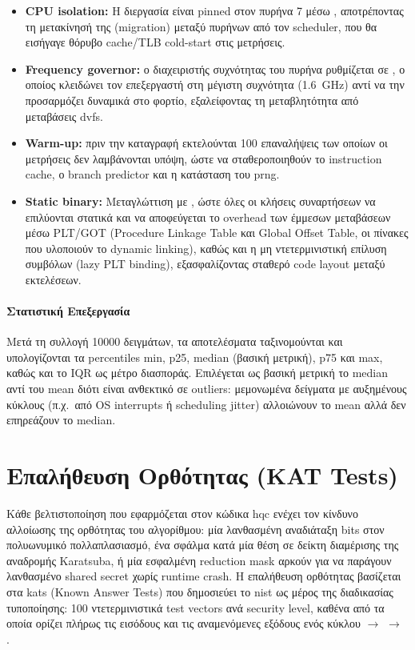 \begin{itemize}
  \item \textbf{CPU isolation:} Η διεργασία είναι pinned στον πυρήνα 7 μέσω ,
    αποτρέποντας τη μετακίνησή της (migration) μεταξύ πυρήνων από τον scheduler, που
    θα εισήγαγε θόρυβο cache/TLB cold-start στις μετρήσεις.
  \item \textbf{Frequency governor:} ο διαχειριστής συχνότητας του 
  πυρήνα ρυθμίζεται σε , ο οποίος κλειδώνει τον 
  επεξεργαστή στη μέγιστη συχνότητα (\SI{1.6}{\giga\hertz}) αντί να 
  την προσαρμόζει δυναμικά στο φορτίο, εξαλείφοντας τη μεταβλητότητα 
  από μεταβάσεις \gls{dvfs}.
  \item \textbf{Warm-up:} πριν την καταγραφή εκτελούνται \num{100} 
  επαναλήψεις των οποίων οι μετρήσεις δεν λαμβάνονται υπόψη, ώστε να 
  σταθεροποιηθούν το instruction cache, ο branch predictor και η κατάσταση του \gls{prng}.
  \item \textbf{Static binary:} Μεταγλώττιση με , ώστε 
  όλες οι κλήσεις συναρτήσεων να επιλύονται στατικά και να αποφεύγεται 
  το overhead των έμμεσων μεταβάσεων μέσω PLT/GOT (Procedure Linkage 
  Table και Global Offset Table, οι πίνακες που υλοποιούν το dynamic 
  linking), καθώς και η μη ντετερμινιστική επίλυση συμβόλων (lazy PLT 
  binding), εξασφαλίζοντας σταθερό code layout μεταξύ εκτελέσεων.
\end{itemize}

\paragraph{Στατιστική Επεξεργασία}

Μετά τη συλλογή \num{10000} δειγμάτων, τα αποτελέσματα ταξινομούνται και
υπολογίζονται τα percentiles min, p25, median (βασική μετρική), p75 και
max, καθώς και το IQR ως μέτρο διασποράς. Επιλέγεται ως βασική μετρική το median αντί του mean 
διότι είναι ανθεκτικό σε outliers: μεμονωμένα δείγματα με αυξημένους 
κύκλους (π.χ.\ από OS interrupts ή scheduling jitter) αλλοιώνουν το
mean αλλά δεν επηρεάζουν το median.

\section{Επαλήθευση Ορθότητας (KAT Tests)}
\label{sec:kat-tests}

Κάθε βελτιστοποίηση που εφαρμόζεται στον κώδικα \gls{hqc} ενέχει τον 
κίνδυνο αλλοίωσης της ορθότητας του αλγορίθμου: μία λανθασμένη αναδιάταξη bits στον πολυωνυμικό
πολλαπλασιασμό, ένα σφάλμα κατά μία θέση σε δείκτη διαμέρισης της αναδρομής Karatsuba, ή μία εσφαλμένη reduction
mask αρκούν για να παράγουν λανθασμένο shared secret χωρίς runtime crash.
Η επαλήθευση ορθότητας βασίζεται στα \glspl{kat} (Known Answer Tests) που
δημοσιεύει το \gls{nist}
ως μέρος της διαδικασίας τυποποίησης: \num{100} ντετερμινιστικά test vectors ανά
security level, καθένα από τα οποία ορίζει πλήρως τις εισόδους και τις
αναμενόμενες εξόδους ενός κύκλου \KeyGen $\to$ \Encaps $\to$ \Decaps.

